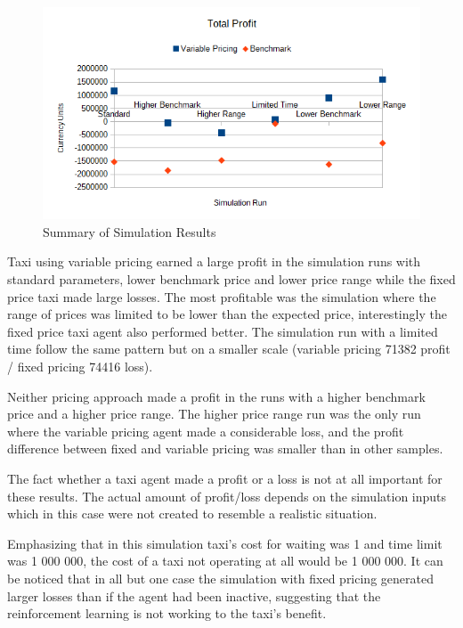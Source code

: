 \begin{figure}
\begin{center}
  \includegraphics[width=\textwidth]{../figures/results_summary}
  \caption{
    Summary of Simulation Results
    \label{figure:results:summary}
  }
\end{center}
\end{figure}

Taxi using variable pricing earned a large profit in the simulation runs with
standard parameters, lower benchmark price and lower price range while the
fixed price taxi made large losses. The most profitable was the simulation
where the range of prices was limited to be lower than the expected price,
interestingly the fixed price taxi agent also performed better. The simulation
run with a limited time follow the same pattern but on a smaller scale
(variable pricing 71382 profit / fixed pricing 74416 loss).

Neither pricing approach made a profit in the runs with a higher benchmark
price and a higher price range. The higher price range run was the only run
where the variable pricing agent made a considerable loss, and the profit
difference between fixed and variable pricing was smaller than in other
samples.

The fact whether a taxi agent made a profit or a loss is not at all important
for these results. The actual amount of profit/loss depends on the simulation
inputs which in this case were not created to resemble a realistic situation.

Emphasizing that in this simulation taxi's cost for waiting was 1 and time
limit was 1 000 000, the cost of a taxi not operating at all would be 1 000
000. It can be noticed that in all but one case the simulation with fixed
pricing generated larger losses than if the agent had been inactive, suggesting
that the reinforcement learning is not working to the taxi's benefit.


